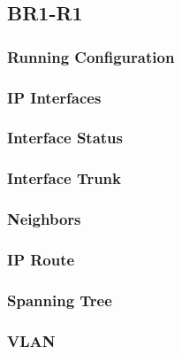 \subsection{BR1-R1}
\subsubsection{Running Configuration}


\subsubsection{IP Interfaces}


\subsubsection{Interface Status}


\subsubsection{Interface Trunk}


\subsubsection{Neighbors}


\subsubsection{IP Route}


\subsubsection{Spanning Tree}


\subsubsection{VLAN}



